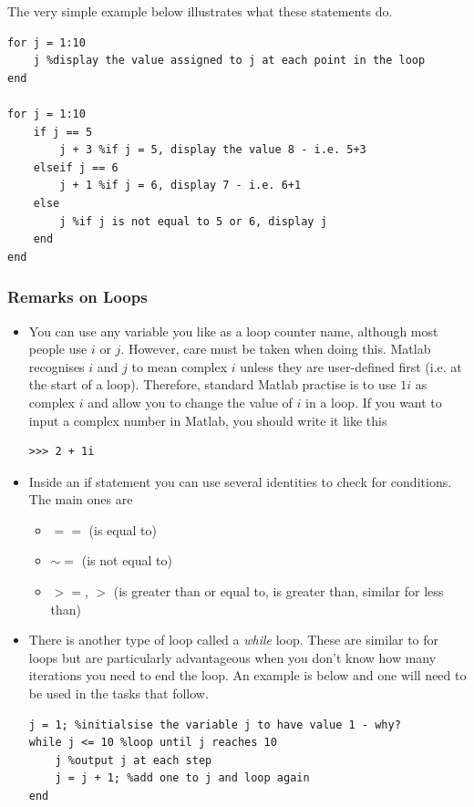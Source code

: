 \documentclass[12pt]{report}
\begin{document}
The very simple example below illustrates what these statements do.

\begin{lstlisting}
for j = 1:10
	j %display the value assigned to j at each point in the loop
end

for j = 1:10
	if j == 5
		j + 3 %if j = 5, display the value 8 - i.e. 5+3
	elseif j == 6
		j + 1 %if j = 6, display 7 - i.e. 6+1
	else
		j %if j is not equal to 5 or 6, display j
	end
end

\end{lstlisting}

\subsubsection{Remarks on Loops}

\begin{itemize}
\item You can use any variable you like as a loop counter name, although most people use $i$ or $j$. However, care must be taken when doing this. Matlab recognises $i$ and $j$ to mean complex $i$ unless they are user-defined first (i.e. at the start of a loop). Therefore, standard Matlab practise is to use $1i$ as complex $i$ and allow you to change the value of $i$ in a loop. If you want to input a complex number in Matlab, you should write it like this
\begin{lstlisting}
>>> 2 + 1i
\end{lstlisting}
\item Inside an if statement you can use several identities to check for conditions. The main ones are 
\begin{itemize}
\item $==$ (is equal to)
\item $\sim =$ (is not equal to)
\item $>=$, $>$ (is greater than or equal to, is greater than, similar for less than)
\end{itemize}
\item There is another type of loop called a \textit{while} loop. These are similar to for loops but are particularly advantageous when you don't know how many iterations you need to end the loop. An example is below and one will need to be used in the tasks that follow.
\clearpage
\begin{lstlisting}
j = 1; %initialsise the variable j to have value 1 - why?
while j <= 10 %loop until j reaches 10
    j %output j at each step
    j = j + 1; %add one to j and loop again
end
\end{lstlisting}
\end{itemize}
\end{document}
